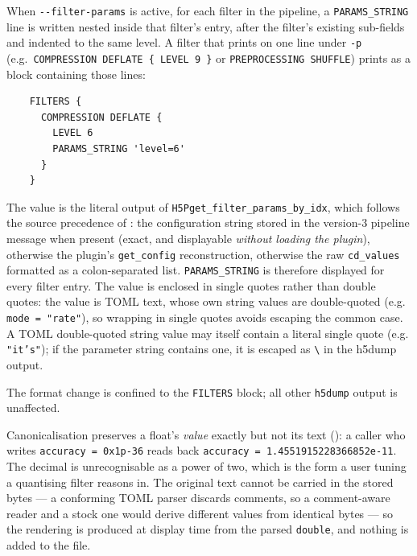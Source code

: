 \documentclass[../RFC-HDFG-2026-001.tex]{subfiles}
\begin{document}
When \texttt{-{}-filter-params} is active, for each filter in the pipeline, a
\texttt{PARAMS\_STRING} line is written nested inside that filter's entry,
after the filter's existing sub-fields and indented to the same level.  A
filter that prints on one line under \texttt{-p} (e.g.\
\texttt{COMPRESSION DEFLATE \{ LEVEL 9 \}} or
\texttt{PREPROCESSING SHUFFLE}) prints as a block containing those lines:

\begin{verbatim}
    FILTERS {
      COMPRESSION DEFLATE {
        LEVEL 6
        PARAMS_STRING 'level=6'
      }
    }
\end{verbatim}

The value is the literal output of
\texttt{H5Pget\_filter\_params\_by\_idx}, which follows the source
precedence of \SectionRef{sec:introspection}: the configuration string
stored in the version-3 pipeline message when present (exact, and
displayable \emph{without loading the plugin}), otherwise the plugin's
\texttt{get\_config} reconstruction, otherwise the raw \texttt{cd\_values}
formatted as a colon-separated list.  \texttt{PARAMS\_STRING} is therefore
displayed for every filter entry.  The value is enclosed in single
quotes rather than double quotes: the value is TOML text, whose own string
values are double-quoted (e.g. \texttt{mode = "rate"}), so wrapping in
single quotes avoids escaping the common case. A TOML double-quoted string
value may itself contain a literal single quote (e.g. \texttt{"it's"}); if
the parameter string contains one, it is escaped as
\texttt{\textbackslash\textquotesingle} in the h5dump output.

The format change is confined to the \texttt{FILTERS} block; all other
\texttt{h5dump} output is unaffected.

\label{sec:h5dump-hex-annotation}

Canonicalisation preserves a float's \emph{value} exactly but not its text
(\SectionRef{sec:config-canonical-form}): a caller who writes
\texttt{accuracy = 0x1p-36} reads back
\texttt{accuracy = 1.4551915228366852e-11}.  The decimal is unrecognisable
as a power of two, which is the form a user tuning a
quantising filter reasons in.  The original text cannot be carried in the
stored bytes --- a conforming TOML parser discards comments, so a
comment-aware reader and a stock one would derive different values from
identical bytes --- so the rendering is produced at display time from the
parsed \texttt{double}, and nothing is added to the file.
\end{document}
